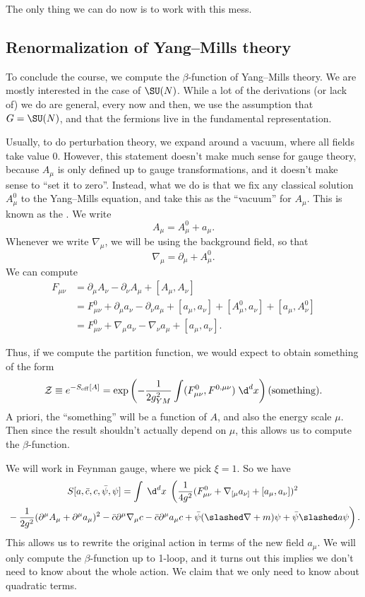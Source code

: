 \documentclass[a4paper]{article}
\begin{document}
The only thing we can do now is to work with this mess.

\subsection{Renormalization of Yang--Mills theory}
To conclude the course, we compute the $\beta$-function of Yang--Mills theory. We are mostly interested in the case of $\SU(N)$. While a lot of the derivations (or lack of) we do are general, every now and then, we use the assumption that $G = \SU(N)$, and that the fermions live in the fundamental representation.

Usually, to do perturbation theory, we expand around a vacuum, where all fields take value $0$. However, this statement doesn't make much sense for gauge theory, because $A_\mu$ is only defined up to gauge transformations, and it doesn't make sense to ``set it to zero''. Instead, what we do is that we fix any classical solution $A_\mu^0$ to the Yang--Mills equation, and take this as the ``vacuum'' for $A_\mu$. This is known as the . We write
\[
  A_\mu = A_\mu^0 + a_\mu.
\]
Whenever we write $\nabla_\mu$, we will be using the background field, so that
\[
  \nabla_\mu = \partial_\mu + A^0_\mu.
\]
We can compute
\begin{align*}
  F_{\mu\nu} &= \partial_\mu A_\nu - \partial_\nu A_\mu + [A_\mu, A_\nu]\\
  &= F_{\mu\nu}^0 + \partial_\mu a_\nu - \partial_\nu a_\mu + [a_\mu, a_\nu] + [A_\mu^0, a_\nu] + [a_\mu, A_\nu^0]\\
  &= F_{\mu\nu}^0 + \nabla_\mu a_\nu - \nabla_\nu a_\mu + [a_\mu, a_\nu].
\end{align*}

Thus, if we compute the partition function, we would expect to obtain something of the form
\[
  \mathcal{Z} \equiv e^{-S_{\mathrm{eff}}[A]} = \exp\left(-\frac{1}{2g_{YM}^2} \int (F_{\mu\nu}^0, F^{0, \mu\nu})\;\d^d x\right) \text{(something)}.
\]
A priori, the ``something'' will be a function of $A$, and also the energy scale $\mu$. Then since the result shouldn't actually depend on $\mu$, this allows us to compute the $\beta$-function. %

We will work in Feynman gauge, where we pick $\xi = 1$. So we have
\begin{multline*}
  S[a, \bar{c}, c, \bar\psi, \psi] = \int\;\d^d x\; \left(\frac{1}{4g^2}(F_{\mu\nu}^0 + \nabla_{[\mu}a_{\nu]} + [a_\mu, a_\nu])^2\right. \\
  \left.\vphantom{\frac{1}{4g^2}}- \frac{1}{2g^2} (\partial^\mu A_\mu + \partial^\mu a_\mu)^2 - \bar{c}\partial^\mu \nabla_\mu c - \bar{c} \partial^\mu a_\mu c + \bar\psi (\slashed \nabla + m) \psi + \bar\psi \slashed a \psi\right).
\end{multline*}
This allows us to rewrite the original action in terms of the new field $a_\mu$. We will only compute the $\beta$-function up to 1-loop, and it turns out this implies we don't need to know about the whole action. We claim that we only need to know about quadratic terms.
\end{document}
